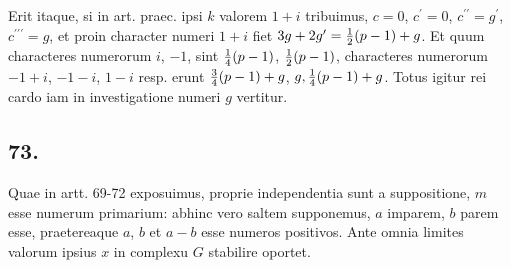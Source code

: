 \documentclass[twoside,12pt]{memoir}
\let\oldfrac\frac
\def\frac#1#2{\mathchoice{\tfrac{#1}{#2}}{\oldfrac{#1}{#2}}{\genfrac{}{}{}{2}{#1}{#2\mathstrut}}{\genfrac{}{}{}{3}{#1}{#2\mathstrut}}}
\begin{document}
Erit itaque, si in art. praec. ipsi \(k\) valorem \(1+i\) tribuimus, \(c=0\), \( c^{\prime}=0\), \(c^{\prime \prime}=g^{\prime}\), \( c^{\prime \prime \prime}=g\), et proin character numeri \(1+i\) fiet \(3 g+2 g^{\prime}=\frac{1}{2}(p-1)+g\). Et quum characteres numerorum \(i\), \(-1\), sint \(\frac{1}{4}(p-1)\), \( \frac{1}{2}(p-1)\), characteres numerorum \(-1+i\), \(-1-i\), \( 1-i\) resp. erunt \(\frac{3}{4}(p-1)+g\), \( g, \frac{1}{4}(p-1)+g\). Totus igitur rei cardo iam in investigatione numeri \(g\) vertitur.

\subsection*{73.}
 
Quae in artt. 69-72 exposuimus, proprie independentia sunt a suppositione, \(m\) esse numerum primarium: abhinc vero saltem supponemus, \(a\) imparem, \(b\) parem esse, praetereaque \(a\), \(b\) et \(a-b\) esse numeros positivos. Ante omnia limites valorum ipsius \(x\) in complexu \(G\) stabilire oportet.\pagebreak%
 
\end{document}
